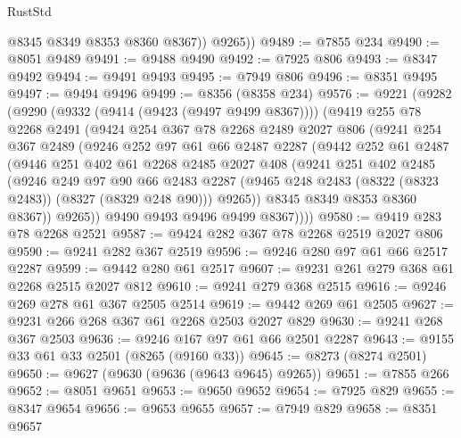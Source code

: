 \begin{lexlean}{RustStd}
\begin{coremodule}
{\begin{coremodule}
{{{{{{{{{{{{{{{{{{{{{{{{{{{{{{{{{{{{{{{{{{{{{{{{{{{{{{            @8345
            @8349
            @8353
            @8360
            @8367))
        @9265))
@9489 := @7855 @234
@9490 := @8051 @9489
@9491 := @9488 @9490
@9492 := @7925 @806
@9493 := @8347 @9492
@9494 := @9491 @9493
@9495 := @7949 @806
@9496 := @8351 @9495
@9497 := @9494 @9496
@9499 := @8356 (@8358 @234)
@9576 := @9221
    (@9282
      (@9290
        (@9332 (@9414 (@9423 (@9497 @9499 @8367))))
        (@9419
          @255
          @78
          @2268
          @2491
          (@9424
            @254
            @367
            @78
            @2268
            @2489
            @2027
            @806
            (@9241
              @254
              @367
              @2489
              (@9246
                @252
                @97
                @61
                @66
                @2487
                @2287
                (@9442
                  @252
                  @61
                  @2487
                  (@9446
                    @251
                    @402
                    @61
                    @2268
                    @2485
                    @2027
                    @408
                    (@9241
                      @251
                      @402
                      @2485
                      (@9246
                        @249
                        @97
                        @90
                        @66
                        @2483
                        @2287
                        (@9465 @248 @2483 (@8322 (@8323 @2483)) (@8327 (@8329 @248 @90)))
                        @9265))
                    @8345
                    @8349
                    @8353
                    @8360
                    @8367))
                @9265))
            @9490
            @9493
            @9496
            @9499
            @8367))))
@9580 := @9419 @283 @78 @2268 @2521
@9587 := @9424 @282 @367 @78 @2268 @2519 @2027 @806
@9590 := @9241 @282 @367 @2519
@9596 := @9246 @280 @97 @61 @66 @2517 @2287
@9599 := @9442 @280 @61 @2517
@9607 := @9231 @261 @279 @368 @61 @2268 @2515 @2027 @812
@9610 := @9241 @279 @368 @2515
@9616 := @9246 @269 @278 @61 @367 @2505 @2514
@9619 := @9442 @269 @61 @2505
@9627 := @9231 @266 @268 @367 @61 @2268 @2503 @2027 @829
@9630 := @9241 @268 @367 @2503
@9636 := @9246 @167 @97 @61 @66 @2501 @2287
@9643 := @9155 @33 @61 @33 @2501 (@8265 (@9160 @33))
@9645 := @8273 (@8274 @2501)
@9650 := @9627 (@9630 (@9636 (@9643 @9645) @9265))
@9651 := @7855 @266
@9652 := @8051 @9651
@9653 := @9650 @9652
@9654 := @7925 @829
@9655 := @8347 @9654
@9656 := @9653 @9655
@9657 := @7949 @829
@9658 := @8351 @9657
}}}}}}}}}}}}}}}}}}}}}}}}}}}}}}}}}}}}}}}}}}}}}}}}}}}}}}
\end{coremodule}}
\end{coremodule}
\end{lexlean}
